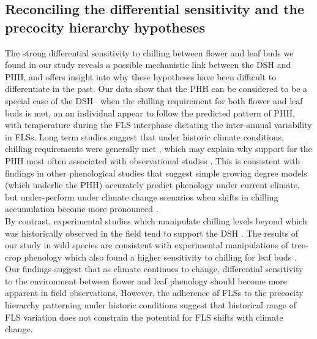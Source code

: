 \documentclass[11pt]{article}
\begin{document}
\subsection*{Reconciling the differential sensitivity and the precocity hierarchy hypotheses}
The strong differential sensitivity to chilling between flower and leaf buds we found in our study reveals a possible mechanistic link between the DSH and PHH, and offers insight into why these hypotheses have been difficult to differentiate in the past. Our data show that the PHH can be considered to be a special case of the DSH-- when the chilling requirement for both flower and leaf buds is met, an an individual appear to follow the predicted pattern of PHH, with temperature during the FLS interphase dictating the inter-annual variability in FLSs. Long term studies suggest that under historic climate conditions, chilling requirements were generally met \citep{}, which may explain why support for the PHH most often associated with observational studies \citep[e.g.][]{COSMULESCU:2020aa,Guo2014}. This is consistent with findings in other phenological studies that suggest simple growing degree models (which underlie the PHH) accurately predict phenology under current climate, but under-perform under climate change scenarios when shifts in chilling accumulation become more pronounced \citep{Linkosalo2008}.\\ 

\noindent By contrast, experimental studies which manipulate chilling levels beyond which was historically observed in the field tend to support the DSH \citep[e.g.][]{Aslani2009,Gariglio2006}. The results of our study in wild species are consistent with experimental manipulations of tree-crop phenology which also found a higher sensitivity to chilling for leaf buds \citep{Gariglio2006,Citadin2001}. Our findings suggest that as climate continues to change, differential sensitivity to the environment between flower and leaf phenology should become more apparent in field observations. However, the adherence of FLSs to the precocity hierarchy patterning under historic conditions suggest that historical range of FLS variation does not constrain the potential for FLS shifts with climate change.
\end{document}
